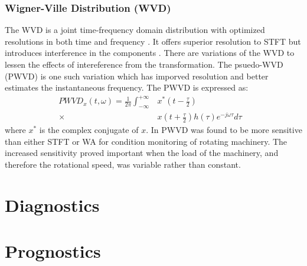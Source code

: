 \documentclass[conference]{IEEEtran}
\begin{document}
\subsubsection{Wigner-Ville Distribution (WVD)}
The WVD is a joint time-frequency domain distribution with optimized resolutions in both time and frequency \cite{DaiGao}\cite{WangChen}. It offers superior resolution to STFT but introduces interference in the components \cite{Vibration Book}. There are variations of the WVD to lessen the effects of intereference from the transformation. The psuedo-WVD (PWVD) is one such variation which has imporved resolution and better estimates the instantaneous frequency. The PWVD is expressed as:
\begin{align*}
  PWVD_x(t, \omega) = \frac{1}{2\pi}\int^{+\infty}_{-\infty}&x^{*}\left(t-\frac{\tau}{2}\right)&\\ 
  \times &x\left(t+\frac{\tau}{2}\right)h(\tau)e^{-j\omega\tau}d\tau
\end{align*}
where $x^*$ is the complex conjugate of $x$. In \cite{WangChen} PWVD was found to be more sensitive than either STFT or WA for condition monitoring of rotating machinery. The increased sensitivity proved important when the load of the machinery, and therefore the rotational speed, was variable rather than constant.


\section{Diagnostics}

\section{Prognostics}
\end{document}
